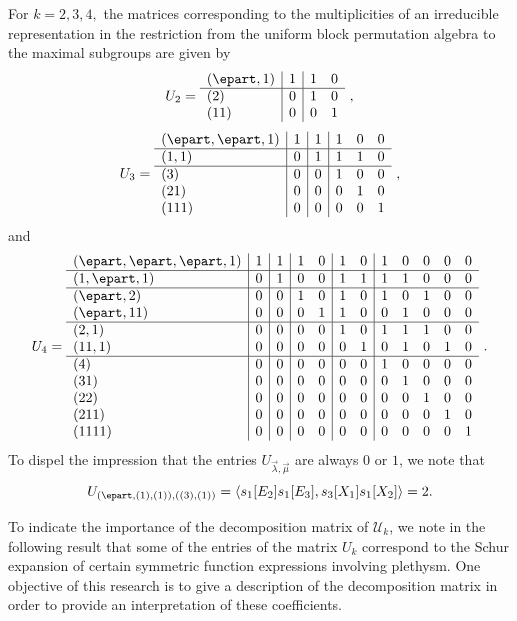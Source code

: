 \begin{example}  
For $k=2,3,4,$ the matrices corresponding to the multiplicities of an irreducible 
representation in the restriction from the uniform block permutation algebra
to the maximal subgroups are given by
$$
U_2 =
\begin{array}{l|r|rr}
(\epart, 1) & 1 & 1 & 0\\
\hline
(2) & 0 & 1 & 0\\
(11) & 0 & 0 & 1
\end{array}~,
$$
$$
U_3 = \begin{array}{l|r|r|rrr}
(\epart, \epart, 1) & 1 & 1 & 1 & 0 & 0\\
\hline
(1, 1) & 0 & 1 & 1 & 1 & 0\\
\hline
(3) & 0 & 0 & 1 & 0 & 0\\
(21) & 0 & 0 & 0 & 1 & 0\\
(111) & 0 & 0 & 0 & 0 & 1
\end{array}~,
$$
and
$$
U_4 = \begin{array}{l|r|r|rr|rr|rrrrr}
(\epart, \epart, \epart, 1) & 1 & 1 & 1 & 0 & 1 & 0 & 1 & 0 & 0 & 0 & 0\\
\hline
(1, \epart, 1) &0 & 1 & 0 & 0 & 1 & 1 & 1 & 1 & 0 & 0 & 0\\
\hline
(\epart, 2) &0 & 0 & 1 & 0 & 1 & 0 & 1 & 0 & 1 & 0 & 0\\
(\epart, 11) &0 & 0 & 0 & 1 & 1 & 0 & 0 & 1 & 0 & 0 & 0\\
\hline
(2, 1) &0 & 0 & 0 & 0 & 1 & 0 & 1 & 1 & 1 & 0 & 0\\
(11, 1) &0 & 0 & 0 & 0 & 0 & 1 & 0 & 1 & 0 & 1 & 0\\
\hline
(4) &0 & 0 & 0 & 0 & 0 & 0 & 1 & 0 & 0 & 0 & 0\\
(31) &0 & 0 & 0 & 0 & 0 & 0 & 0 & 1 & 0 & 0 & 0\\
(22) &0 & 0 & 0 & 0 & 0 & 0 & 0 & 0 & 1 & 0 & 0\\
(211) &0 & 0 & 0 & 0 & 0 & 0 & 0 & 0 & 0 & 1 & 0\\
(1111) &0 & 0 & 0 & 0 & 0 & 0 & 0 & 0 & 0 & 0 & 1
\end{array}~.
$$
To dispel the impression that the entries $U_{\vec{\lambda},\vec{\mu}}$ are always $0$ or $1$,
we note that
\begin{equation*}
    U_{(\epart,(1),(1)), ((3),(1))} = \left< s_1[E_2] s_1[E_3], s_3[X_1] s_1[X_2] \right> = 2.
\end{equation*}
\end{example}

To indicate the importance of the decomposition matrix of $\mathcal{U}_k$,
we note in the following result that some of the entries of the matrix $U_k$
correspond to the Schur expansion of certain
symmetric function expressions involving plethysm.
One objective of this research is to give a description of
the decomposition matrix in order to provide an interpretation
of these coefficients.

